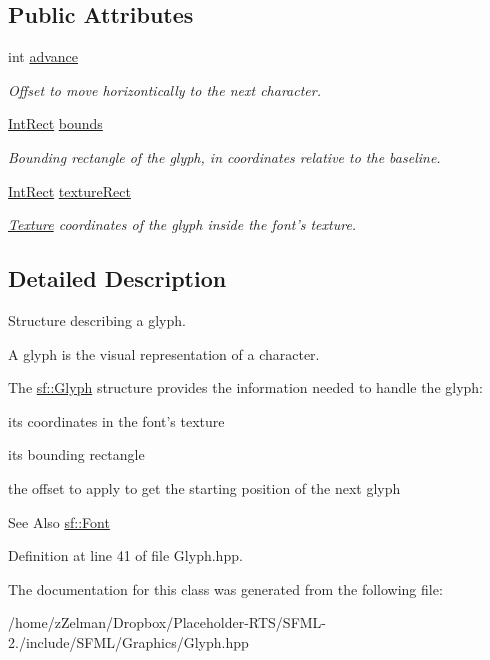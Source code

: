 \subsection*{Public Attributes}
\begin{DoxyCompactItemize}
\item 
\hypertarget{classsf_1_1Glyph_a50b93f441db501d10308007f63382166}{int \hyperlink{classsf_1_1Glyph_a50b93f441db501d10308007f63382166}{advance}}\label{classsf_1_1Glyph_a50b93f441db501d10308007f63382166}

\begin{DoxyCompactList}\small\item\em Offset to move horizontically to the next character. \end{DoxyCompactList}\item 
\hypertarget{classsf_1_1Glyph_afe4cd37e5839955d7dd008e178d41f0c}{\hyperlink{classsf_1_1Rect}{Int\-Rect} \hyperlink{classsf_1_1Glyph_afe4cd37e5839955d7dd008e178d41f0c}{bounds}}\label{classsf_1_1Glyph_afe4cd37e5839955d7dd008e178d41f0c}

\begin{DoxyCompactList}\small\item\em Bounding rectangle of the glyph, in coordinates relative to the baseline. \end{DoxyCompactList}\item 
\hypertarget{classsf_1_1Glyph_a0d502d326449f8c49011ed91d2805f5b}{\hyperlink{classsf_1_1Rect}{Int\-Rect} \hyperlink{classsf_1_1Glyph_a0d502d326449f8c49011ed91d2805f5b}{texture\-Rect}}\label{classsf_1_1Glyph_a0d502d326449f8c49011ed91d2805f5b}

\begin{DoxyCompactList}\small\item\em \hyperlink{classsf_1_1Texture}{Texture} coordinates of the glyph inside the font's texture. \end{DoxyCompactList}\end{DoxyCompactItemize}


\subsection{Detailed Description}
Structure describing a glyph. 

A glyph is the visual representation of a character.

The \hyperlink{classsf_1_1Glyph}{sf\-::\-Glyph} structure provides the information needed to handle the glyph\-: \begin{DoxyItemize}
\item its coordinates in the font's texture \item its bounding rectangle \item the offset to apply to get the starting position of the next glyph\end{DoxyItemize}
\begin{DoxySeeAlso}{See Also}
\hyperlink{classsf_1_1Font}{sf\-::\-Font} 
\end{DoxySeeAlso}


Definition at line 41 of file Glyph.\-hpp.



The documentation for this class was generated from the following file\-:\begin{DoxyCompactItemize}
\item 
/home/z\-Zelman/\-Dropbox/\-Placeholder-\/\-R\-T\-S/\-S\-F\-M\-L-\/2./include/\-S\-F\-M\-L/\-Graphics/Glyph.\-hpp\end{DoxyCompactItemize}
